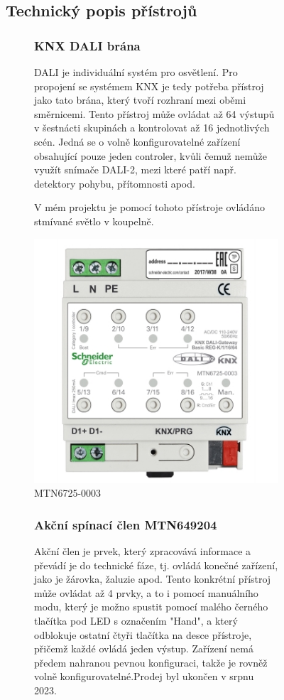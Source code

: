 \documentclass[12pt, a4paper,
twoside,        %
openright
]{report}
\begin{document}
\begin{figure}[h]
\subsection{Technický popis přístrojů}
\centering
\begin{subfigure}{0.85\textwidth}
	\subsubsection{KNX DALI brána}
	DALI je individuální systém pro osvětlení. Pro propojení se systémem KNX je tedy potřeba přístroj jako tato brána, který tvoří rozhraní mezi oběmi směrnicemi. Tento přístroj může ovládat až 64 výstupů v šestnácti skupinách a kontrolovat až 16 jednotlivých scén. Jedná se o volně konfigurovatelné zařízení obsahující pouze jeden controler, kvůli čemuž nemůže využít snímače DALI-2, mezi které patří např. detektory pohybu, přítomnosti apod.


	\noindent V mém projektu je pomocí tohoto přístroje ovládáno stmívané světlo v koupelně.


		\centering
		\includegraphics[scale=0.34]{image/MTN6725-0003.jpg}
		\caption{MTN6725-0003}
		\label{image:1}
\end{subfigure}

\begin{subfigure}{0.85\textwidth}
	\subsubsection{Akční spínací člen MTN649204}
	Akční člen je prvek, který zpracovává informace a převádí je do technické fáze, tj. ovládá konečné zařízení, jako je žárovka, žaluzie apod. Tento konkrétní přístroj může ovládat až 4 prvky, a to i pomocí manuálního modu, který je možno spustit pomocí malého černého tlačítka pod LED s označením "Hand", a který odblokuje ostatní čtyři tlačítka na desce přístroje, přičemž každé ovládá jeden výstup. Zařízení nemá předem nahranou pevnou konfiguraci, takže je rovněž volně konfigurovatelné.Prodej byl ukončen v srpnu 2023.



\end{subfigure}
\end{figure}
\end{document}
